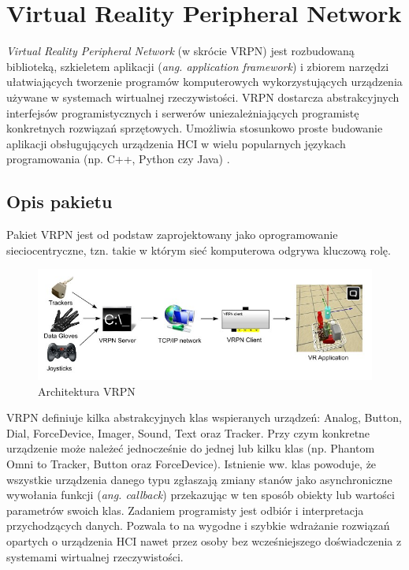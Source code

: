 \documentclass[licencjacka]{pracamgr}
\begin{document}
\chapter{Virtual Reality Peripheral Network}
\textit{Virtual Reality Peripheral Network} (w skrócie VRPN) jest rozbudowaną biblioteką, szkieletem aplikacji (\textit{ang. application framework}) i zbiorem narzędzi ułatwiających tworzenie programów komputerowych wykorzystujących urządzenia używane w systemach wirtualnej rzeczywistości. VRPN dostarcza abstrakcyjnych interfejsów programistycznych i serwerów uniezależniających programistę konkretnych rozwiązań sprzętowych. Umożliwia stosunkowo proste budowanie aplikacji obsługujących urządzenia HCI w wielu popularnych językach programowania (np. C++, Python czy Java) \cite{taylorHudsonSeegerWeber}.

\section{Opis pakietu}
Pakiet VRPN jest od podstaw zaprojektowany jako oprogramowanie sieciocentryczne, tzn. takie w którym sieć komputerowa odgrywa kluczową rolę.

\begin{figure}[H]
\centering
\includegraphics[scale=0.6,center]{vrpn}
\caption{Architektura VRPN}
\end{figure}

VRPN definiuje kilka abstrakcyjnych klas wspieranych urządzeń: Analog, Button, Dial, ForceDevice, Imager, Sound, Text oraz Tracker. Przy czym konkretne urządzenie może należeć jednocześnie do jednej lub kilku klas (np. Phantom Omni to Tracker, Button oraz ForceDevice). Istnienie ww. klas powoduje, że wszystkie urządzenia danego typu zgłaszają zmiany stanów jako asynchroniczne wywołania funkcji (\textit{ang. callback}) przekazując w ten sposób obiekty lub wartości parametrów swoich klas. Zadaniem programisty jest odbiór i interpretacja przychodzących danych. Pozwala to na wygodne i szybkie wdrażanie rozwiązań opartych o urządzenia HCI nawet przez osoby bez wcześniejszego doświadczenia z systemami wirtualnej rzeczywistości.
\end{document}
